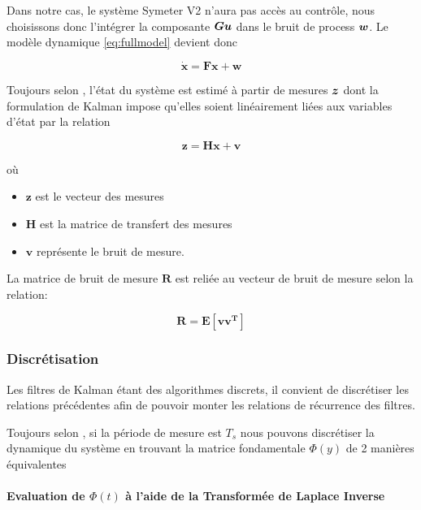 \documentclass[12pt,a4paper]{report}
\begin{document}
	\para Dans notre cas, le système Symeter V2 n'aura pas accès au contrôle, nous choisissons donc l'intégrer la composante $\boldsymbol{Gu}$ dans le bruit de process $\boldsymbol{w}$. Le modèle dynamique \ref{eq:fullmodel} devient donc 
	
	\begin{equation}
		\label{eq:actualmodel}
			\boldsymbol{
			\dot{x} = Fx + w
		}
	\end{equation}

	\para Toujours selon \cite{zarchan_fundamentals_2009}, l'état du système est estimé à partir de mesures $\boldsymbol{z}$ dont la formulation de Kalman impose qu'elles soient linéairement liées aux variables d'état par la relation 

	\begin{equation}
		\label{eq:mesure_cont}
		\boldsymbol{z=Hx + v}
	\end{equation}

	où

	\begin{itemize}
		\item
		\(\boldsymbol{z}\) est le vecteur des mesures
		\item
		\(\boldsymbol{H}\) est la matrice de transfert des mesures
		\item
		\(\boldsymbol{v}\) représente le bruit de mesure.
	\end{itemize}

	La matrice de bruit de mesure \(\boldsymbol{R}\) est reliée au vecteur	de bruit de mesure selon la relation:

	\begin{equation}
		\label{eq:covmesur_cont}
		\boldsymbol{R = E[vv^T]}
	\end{equation}
	
	\subsubsection{Discrétisation}
	Les filtres de Kalman étant des algorithmes discrets, il convient de discrétiser les relations précédentes afin de pouvoir monter les relations de récurrence des filtres.
	
	\para Toujours selon \cite{zarchan_fundamentals_2009}, si la période de mesure est $T_s$ nous pouvons discrétiser la dynamique du système en trouvant la matrice fondamentale $\Phi(y)$ de 2 manières équivalentes
	
	\paragraph*{Evaluation de $\Phi(t)$ à l'aide de la Transformée de Laplace Inverse}
	
\end{document}
